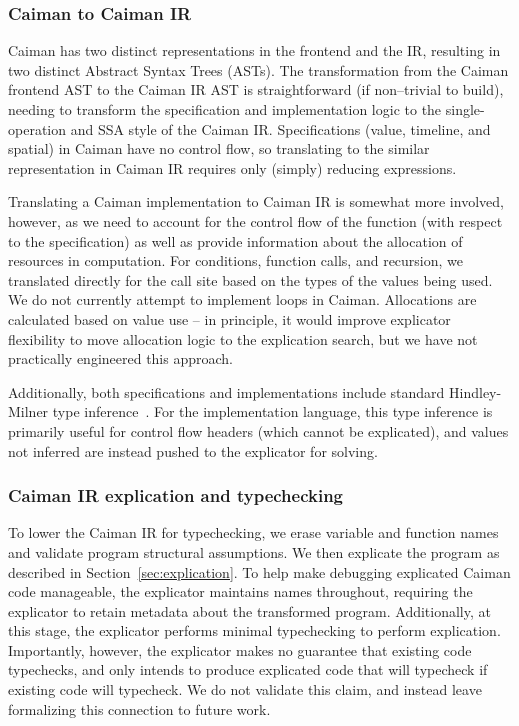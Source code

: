 \subsubsection{Caiman to Caiman IR}

Caiman has two distinct representations in the frontend and the IR, resulting in two distinct Abstract Syntax Trees (ASTs).  The transformation from the Caiman frontend AST to the Caiman IR AST is straightforward (if non--trivial to build), needing to transform the specification and implementation logic to the single-operation and SSA style of the Caiman IR.  Specifications (value, timeline, and spatial) in Caiman have no control flow, so translating to the similar representation in Caiman IR requires only (simply) reducing expressions.  

Translating a Caiman implementation to Caiman IR is somewhat more involved, however, as we need to account for the control flow of the function (with respect to the specification) as well as provide information about the allocation of resources in computation.  For conditions, function calls, and recursion, we translated directly for the call site based on the types of the values being used.  We do not currently attempt to implement loops in Caiman.  Allocations are calculated based on value use -- in principle, it would improve explicator flexibility to move allocation logic to the explication search, but we have not practically engineered this approach.

Additionally, both specifications and implementations include standard Hindley-Milner type inference~\cite{Hindley}.  For the implementation language, this type inference is primarily useful for control flow headers (which cannot be explicated), and values not inferred are instead pushed to the explicator for solving.

\subsubsection{Caiman IR explication and typechecking}

To lower the Caiman IR for typechecking, we erase variable and function names and validate program structural assumptions.  We then explicate the program as described in Section~\ref{sec:explication}.  To help make debugging explicated Caiman code manageable, the explicator maintains names throughout, requiring the explicator to retain metadata about the transformed program.  Additionally, at this stage, the explicator performs minimal typechecking to perform explication.  Importantly, however, the explicator makes no guarantee that existing code typechecks, and only intends to produce explicated code that will typecheck if existing code will typecheck.  We do not validate this claim, and instead leave formalizing this connection to future work.

